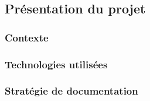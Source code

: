 \subsection{Présentation du projet}
    \subsubsection{Contexte}
        \lipsum[1]

    \subsubsection{Technologies utilisées}
        \lipsum[1]

    \subsubsection{Stratégie de documentation}